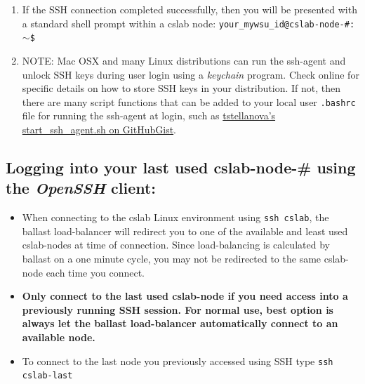 \documentclass[12pt]{article}
\begin{document}
\begin{flushleft}
\begin{enumerate}
  \item If the SSH connection completed successfully, then you will be presented with a standard shell prompt within a cslab node:\break
\texttt{your\_mywsu\_id@cslab-node-\#:$\sim$\$}
  \item NOTE: Mac OSX and many Linux distributions can run the ssh-agent and unlock SSH keys during user login using a \textit{keychain} program. Check online for specific details on how to store SSH keys in your distribution. If not, then there are many script functions that can be added to your local user \texttt{.bashrc} file for running the ssh-agent at login, such as \href{https://gist.github.com/tstellanova/76ee01c1599d9a9433cf}{tstellanova's start\_ssh\_agent.sh on GitHubGist}.
\end{enumerate}

\subsection*{Logging into your last used cslab-node-\# using the \textit{OpenSSH} client:}
\begin{itemize}
  \item When connecting to the cslab Linux environment using \texttt{ssh cslab}, the ballast load-balancer will redirect you to one of the available and least used cslab-nodes at time of connection. Since load-balancing is calculated by ballast on a one minute cycle, you may not be redirected to the same cslab-node each time you connect.

  \item \textbf{Only connect to the last used cslab-node if you need access into a previously running SSH session. For normal use, best option is always let the ballast load-balancer automatically connect to an available node.}
  \item To connect to the last node you previously accessed using SSH type \break
  \texttt{ssh cslab-last}
\end{itemize}


\end{flushleft}
\end{document}
